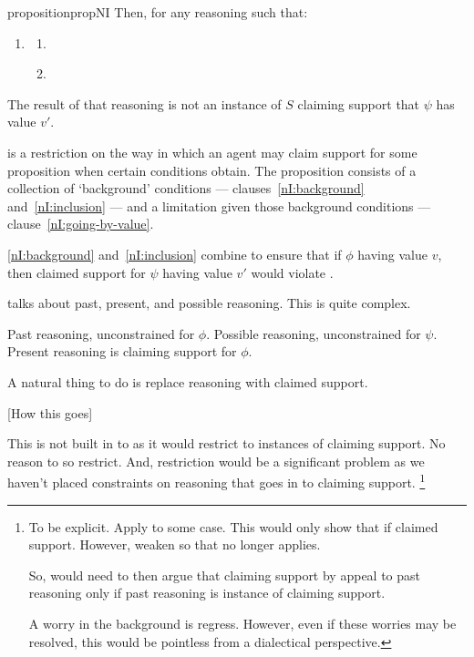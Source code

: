 \begin{note}[\nI{}]
\begin{restatable}[\nI{-}  --- \nI{}]{proposition}{propNI}
    Then, for any reasoning such that:
    \begin{enumerate}[ref=\named{\nIacro{}:\arabic*}, resume*=nI_counter]
    \item\label{nI:going-by-value} \nIClauseValue{}
      \begin{enumerate}[label=\alph*., ref=\named{\nIacro{}3:\alph*}]
      \item\label{nI:going-by-value:phi} \nIClauseValuePhi{}
      \item\label{nI:goingbyvalue:psi} \nIClauseValuePsi{}
      \end{enumerate}
    \end{enumerate}
    The result of that reasoning is not an instance of \(S\) claiming support that \(\psi\) has value \(v'\).
  \end{restatable}
\end{note}

\begin{note}
  \nI{} is a restriction on the way in which an agent may claim support for some proposition when certain conditions obtain.
  The proposition consists of a collection of `background' conditions --- clauses~\ref{nI:background} and~\ref{nI:inclusion} --- and a limitation given those background conditions --- clause~\ref{nI:going-by-value}.

  \ref{nI:background} and~\ref{nI:inclusion} combine to ensure that if \(\phi\) having value \(v\), then claimed support for \(\psi\) having value \(v'\) would violate \eiS{}.
\end{note}

\begin{note}[`Reasoning']
  \nI{} talks about past, present, and possible reasoning.
  This is quite complex.

  Past reasoning, unconstrained for \(\phi\).
  Possible reasoning, unconstrained for \(\psi\).
  Present reasoning is claiming support for \(\phi\).

  A natural thing to do is replace reasoning with claimed support.

  [How this goes]

  This is not built in to \nI{} as it would restrict \nI{} to instances of claiming support.
  No reason to so restrict.
  And, restriction would be a significant problem as we haven't placed constraints on reasoning that goes in to claiming support.\nolinebreak
  \footnote{
    To be explicit.
    Apply \nI{} to some case.
    This would only show that if claimed support.
    However, weaken so that \nI{} no longer applies.

    So, would need to then argue that claiming support by appeal to past reasoning only if past reasoning is instance of claiming support.

    A worry in the background is regress.
    However, even if these worries may be resolved, this would be pointless from a dialectical perspective.
  }
\end{note}

